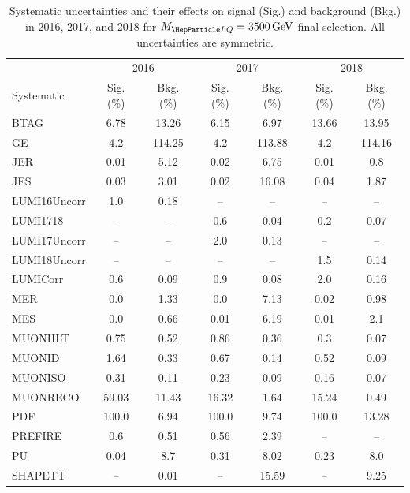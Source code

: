 \begin{table}[H]
	\begin{center}
        \begin{footnotesize}
			\caption{Systematic uncertainties and their effects on signal (Sig.) and background (Bkg.) in 2016, 2017, and 2018 for $\MLQ = \SI{3500}{GeV}$ final selection. All uncertainties are symmetric.}
			\begin{tabular}{lcccccc} \hline \hline
				& \multicolumn{2}{c}{2016} & \multicolumn{2}{c}{2017} & \multicolumn{2}{c}{2018} \\
				Systematic & Sig. (\%) & Bkg. (\%) & Sig. (\%) & Bkg. (\%) & Sig. (\%) & Bkg. (\%) \\ \hline
				BTAG &  6.78  &  13.26 &  6.15  &  6.97 &  13.66  &  13.95 \\
				GE &  4.2  &  114.25 &  4.2  &  113.88 &  4.2  &  114.16 \\
				JER &  0.01  &  5.12 &  0.02  &  6.75 &  0.01  &  0.8 \\
				JES &  0.03  &  3.01 &  0.02  &  16.08 &  0.04  &  1.87 \\
				LUMI16Uncorr &  1.0  &  0.18 & -- & -- & -- & -- \\
				LUMI1718 & -- & -- &  0.6  &  0.04 &  0.2  &  0.07 \\
				LUMI17Uncorr & -- & -- &  2.0  &  0.13 & -- & -- \\
				LUMI18Uncorr & -- & -- & -- & -- &  1.5  &  0.14 \\
				LUMICorr &  0.6  &  0.09 &  0.9  &  0.08 &  2.0  &  0.16 \\
				MER &  0.0  &  1.33 &  0.0  &  7.13 &  0.02  &  0.98 \\
				MES &  0.0  &  0.66 &  0.01  &  6.19 &  0.01  &  2.1 \\
				MUONHLT &  0.75  &  0.52 &  0.86  &  0.36 &  0.3  &  0.07 \\
				MUONID &  1.64  &  0.33 &  0.67  &  0.14 &  0.52  &  0.09 \\
				MUONISO &  0.31  &  0.11 &  0.23  &  0.09 &  0.16  &  0.07 \\
				MUONRECO &  59.03  &  11.43 &  16.32  &  1.64 &  15.24  &  0.49 \\
				PDF &  100.0  &  6.94 &  100.0  &  9.74 &  100.0  &  13.28 \\
				PREFIRE &  0.6  &  0.51 &  0.56  &  2.39 & -- & -- \\
				PU &  0.04  &  8.7 &  0.31  &  8.02 &  0.23  &  8.0 \\
				SHAPETT & -- &  0.01 & -- &  15.59 & -- &  9.25 \\

\end{tabular}
\end{footnotesize}
\end{center}
\end{table}
